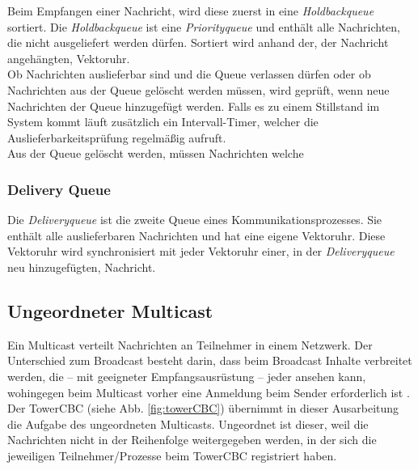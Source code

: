 Beim Empfangen einer Nachricht, wird diese zuerst in eine \textit{Holdbackqueue} sortiert. Die \textit{Holdbackqueue} ist eine \textit{Priorityqueue} und enthält alle Nachrichten, die nicht ausgeliefert werden dürfen. Sortiert wird anhand der, der Nachricht angehängten, Vektoruhr.
\\Ob Nachrichten auslieferbar sind und die Queue verlassen dürfen oder ob Nachrichten aus der Queue gelöscht werden müssen, wird geprüft, wenn neue Nachrichten der Queue hinzugefügt werden. Falls es zu einem Stillstand im System kommt läuft zusätzlich ein Intervall-Timer, welcher die Auslieferbarkeitsprüfung regelmäßig aufruft.
\\Aus der Queue gelöscht werden, müssen Nachrichten welche %

\subsubsection{Delivery Queue}

Die \textit{Deliveryqueue} ist die zweite Queue eines Kommunikationsprozesses. Sie enthält alle auslieferbaren Nachrichten und hat eine eigene Vektoruhr. Diese Vektoruhr wird synchronisiert mit jeder Vektoruhr einer, in der \textit{Deliveryqueue} neu hinzugefügten, Nachricht. 

\subsection{Ungeordneter Multicast}

Ein Multicast verteilt Nachrichten an Teilnehmer in einem Netzwerk. Der Unterschied zum Broadcast besteht darin, dass beim Broadcast Inhalte verbreitet werden, die – mit geeigneter Empfangsausrüstung – jeder ansehen kann, wohingegen beim Multicast vorher eine Anmeldung beim Sender erforderlich ist \cite{wiki:Multicast}.\\
Der TowerCBC (siehe Abb. \ref{fig:towerCBC}) übernimmt in dieser Ausarbeitung die Aufgabe des ungeordneten Multicasts. Ungeordnet ist dieser, weil die Nachrichten nicht in der Reihenfolge weitergegeben werden, in der sich die jeweiligen Teilnehmer/Prozesse beim TowerCBC registriert haben.

